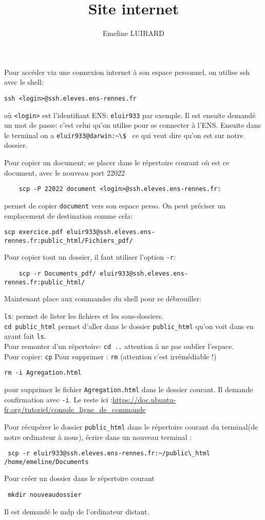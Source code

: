 \documentclass[12pt,a4paper]{article}
\title{Site internet}
\author{Emeline LUIRARD}
\theoremstyle {definition} \newtheorem {defi} {Définition} [section]
\theoremstyle{plain} \newtheorem {theo} {Théorème}[section]
\theoremstyle{remark} \newtheorem*{note}{Remarque}
\begin{document}
\maketitle	
Pour accéder via une connexion internet à son espace personnel, on utilise ssh avec le shell:
\begin{verbatim}
ssh <login>@ssh.eleves.ens-rennes.fr
\end{verbatim}

où \verb|<login>| est l'identifiant ENS: \verb|eluir933| par exemple.
Il est ensuite demandé un mot de passe: c'est celui qu'on utilise pour se connecter à l'ENS. 
Ensuite dans le terminal on a \verb|eluir933@darwin:~\$ | ce qui veut dire qu'on est sur notre dossier.

Pour copier un document: se placer dans le répertoire courant où est ce document, avec le nouveau port 22022
\begin{verbatim}
	scp -P 22022 document <login>@ssh.eleves.ens-rennes.fr:
\end{verbatim} permet de copier \verb|document| vers son espace perso. 
On peut préciser un emplacement de destination comme cela:
\begin{verbatim}
scp exercice.pdf eluir933@ssh.eleves.ens-rennes.fr:public_html/Fichiers_pdf/
\end{verbatim}
Pour copier tout un dossier, il faut utiliser l'option \verb|-r|:
\begin{verbatim}
	scp -r Documents_pdf/ eluir933@ssh.eleves.ens-rennes.fr:public_html/
\end{verbatim}

Maintenant place aux commandes du shell pour se débrouiller:

\verb|ls|: permet de lister les fichiers et les sous-dossiers.
\\ 
\verb|cd public_html| permet d'aller dans le dossier \verb|public_html| qu'on voit dans en ayant fait \verb|ls|.
\\ Pour remonter d'un répertoire: \verb|cd ..|  attention à ne pas oublier l'espace.
\\
Pour copier: \verb|cp|
Pour supprimer : \verb|rm|  (attention c'est irrémédiable !)
\begin{verbatim}
rm -i Agregation.html 
\end{verbatim}
pour supprimer le fichier \verb|Agregation.html| dans le dossier courant. Il demande confirmation avec \verb|-i|.
Le reste ici :\url{https://doc.ubuntu-fr.org/tutoriel/console_ligne_de_commande}

 Pour récupérer le dossier \verb|public_html| dans le répertoire courant du terminal(de notre ordinateur à nous), écrire dans un nouveau terminal :
 \begin{verbatim}
 scp -r eluir933@ssh.eleves.ens-rennes.fr:~/public\_html /home/emeline/Documents
 \end{verbatim}
 Pour créer un dossier dans le répertoire courant 
 \begin{verbatim}
 mkdir nouveaudossier
 \end{verbatim}

Il est demandé le mdp de l'ordinateur distant.
\end{document}
